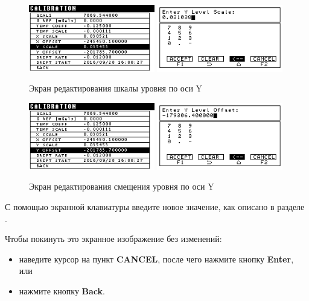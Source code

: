 \begin{figure}[H]
  \centering
  \includegraphics[width=0.49\textwidth]{figures/the_y_level_scale_editing_screen_1}
  \includegraphics[width=0.49\textwidth]{figures/the_y_level_scale_editing_screen_2}
  \caption{Экран редактирования шкалы уровня по оси Y}
  \label{fig:the_y_level_scale_editing_screen}
\end{figure}

\begin{figure}[H]
  \centering
  \includegraphics[width=0.49\textwidth]{figures/the_y_level_offset_editing_screen_1}
  \includegraphics[width=0.49\textwidth]{figures/the_y_level_offset_editing_screen_2}
  \caption{Экран редактирования смещения уровня по оси Y}
  \label{fig:the_y_level_offset_editing_screen}
\end{figure}

С помощью экранной клавиатуры введите новое значение, как описано в разделе
.

Чтобы покинуть это экранное изображение без изменений:
\begin{itemize}
  \item наведите курсор на пункт \textbf{CANCEL}, после чего нажмите кнопку
    \textbf{Enter}, или

  \item нажмите кнопку \textbf{Back}.
\end{itemize}

